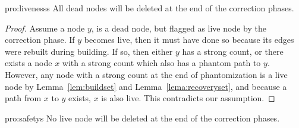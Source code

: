 \begin{reptheorem}{pro:livenesss}
All dead nodes will be deleted at the end of the correction phases.
\end{reptheorem}
\begin{proof}
Assume a node $y$, is a dead node, but flagged as live
node by the correction phase. If $y$ becomes live,
then it must have done so because its edges were rebuilt during building.
If so, then either $y$ has a strong count, or there exists a node $x$ with a strong count
 which also has a phantom path to $y$. However, any node with a strong count at the end
 of phantomization is a live node by Lemma~\ref{lem:buildset} and Lemma~\ref{lema:recoveryset}, and because a path from $x$ to $y$ exists, $x$ is also live.
 This contradicts our
 assumption.
\end{proof}


\begin{reptheorem}{pro:safetys}
No live node will be deleted at the end of the correction phases.
\end{reptheorem}


